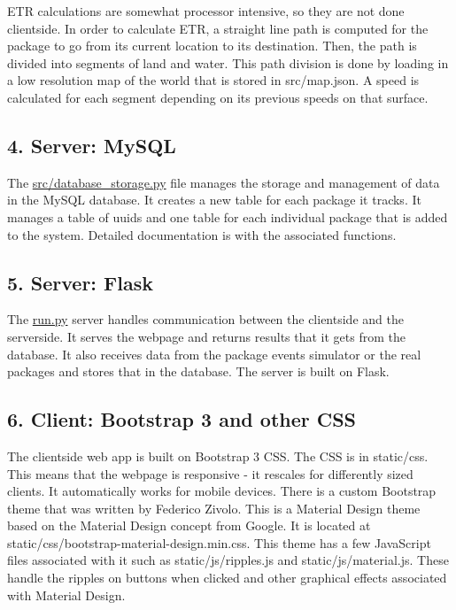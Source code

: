 E\+TR calculations are somewhat processor intensive, so they are not done clientside. In order to calculate E\+TR, a straight line path is computed for the package to go from its current location to its destination. Then, the path is divided into segments of land and water. This path division is done by loading in a low resolution map of the world that is stored in {\ttfamily src/map.\+json}. A speed is calculated for each segment depending on its previous speeds on that surface.

\subsection*{4. Server\+: My\+S\+QL}

The {\ttfamily \hyperlink{database__storage_8py}{src/database\+\_\+storage.\+py}} file manages the storage and management of data in the My\+S\+QL database. It creates a new table for each package it tracks. It manages a table of {\ttfamily uuids} and one table for each individual package that is added to the system. Detailed documentation is with the associated functions.

\subsection*{5. Server\+: Flask}

The {\ttfamily \hyperlink{run_8py}{run.\+py}} server handles communication between the clientside and the serverside. It serves the webpage and returns results that it gets from the database. It also receives data from the package events simulator or the real packages and stores that in the database. The server is built on Flask.

\subsection*{6. Client\+: Bootstrap 3 and other C\+SS}

The clientside web app is built on Bootstrap 3 C\+SS. The C\+SS is in {\ttfamily static/css}. This means that the webpage is responsive -\/ it rescales for differently sized clients. It automatically works for mobile devices. There is a custom Bootstrap theme that was written by Federico Zivolo. This is a Material Design theme based on the Material Design concept from Google. It is located at {\ttfamily static/css/bootstrap-\/material-\/design.\+min.\+css}. This theme has a few Java\+Script files associated with it such as {\ttfamily static/js/ripples.\+js} and {\ttfamily static/js/material.\+js}. These handle the ripples on buttons when clicked and other graphical effects associated with Material Design.

